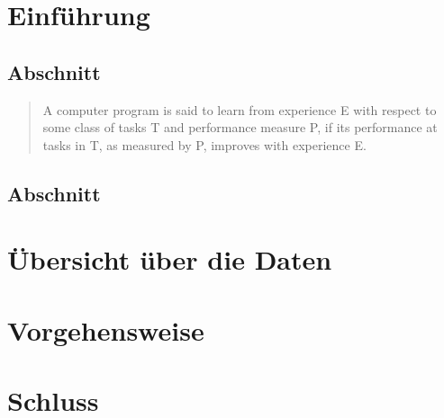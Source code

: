\documentclass[
	a4paper, %
	12pt, %
	twoside, %
	BCOR=5mm, %
	fleqn, %
	bibliography=totoc, %
]{scrreprt}
\begin{document}
	

	\begin{abstract}
		\lipsum[1]
	\end{abstract}

	\tableofcontents

	\chapter{Einführung}
	\section{Abschnitt}
	\lipsum[1]
	
	\begin{quote}
		{\foreignlanguage{english}{A computer program is said to learn from experience E with respect to some class of tasks T and performance measure P, if its performance at tasks in T, as measured by P, improves with experience E.}}
	\end{quote}
	
	\lipsum[2]
	\section{Abschnitt}
	\lipsum[3-4]
	
	\chapter{Übersicht über die Daten}
	\lipsum[1-2]
	
	\chapter{Vorgehensweise}
	\lipsum[3-4]
	
	\chapter{Schluss}
	\lipsum[1-2]

	\newpage
	
\end{document}
